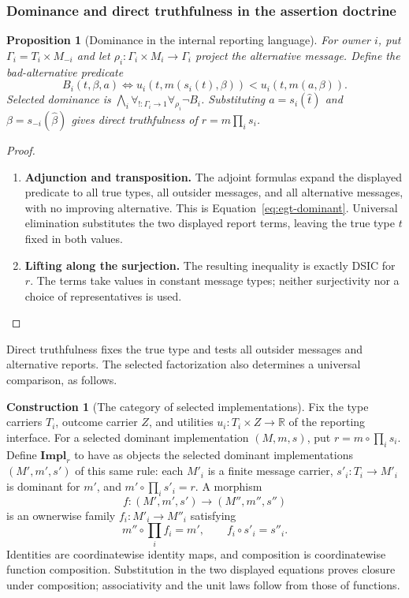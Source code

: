\documentclass[11pt,a4paper]{article}
\numberwithin{equation}{section}
\newtheorem{proposition}[theorem]{Proposition}
\theoremstyle{definition}
\newtheorem{construction}[construction]{Construction}
\theoremstyle{remark}
\theoremstyle{plain}
\begin{document}
\subsubsection{Dominance and direct truthfulness in the assertion doctrine}

\begin{proposition}[Dominance in the internal reporting language]
\label{prop:fib-dominance}
For owner $i$, put $\Gamma_i=T_i\times M_{-i}$ and let
$\rho_i:\Gamma_i\times M_i\to\Gamma_i$ project the alternative message.
Define the bad-alternative predicate
\[
 B_i(t,\beta,a)\iff
 u_i(t,m(s_i(t),\beta))<u_i(t,m(a,\beta)).
\]
Selected dominance is
$\bigwedge_i\forall_{!:\Gamma_i\to1}\forall_{\rho_i}\neg B_i$.
Substituting $a=s_i(\widehat t)$ and
$\beta=s_{-i}(\widehat\beta)$ gives direct truthfulness of
$r=m\prod_i s_i$.
\end{proposition}
\begin{proof}
\leavevmode
\begin{enumerate}[label=\textup{(\arabic*)},leftmargin=*,itemsep=4pt,topsep=3pt]
  \item \textbf{Adjunction and transposition.} The adjoint formulas expand the displayed predicate to all true types,
all outsider messages, and all alternative messages, with no improving
alternative. This is Equation~\eqref{eq:egt-dominant}. Universal
elimination substitutes the two displayed report terms, leaving the
true type $t$ fixed in both values.
  \item \textbf{Lifting along the surjection.} The resulting inequality is exactly
DSIC for $r$. The terms take values in constant message types; neither
surjectivity nor a choice of representatives is used.
\end{enumerate}
\end{proof}

Direct truthfulness fixes the true type and tests all outsider messages
and alternative reports. The selected factorization also determines a
universal comparison, as follows.

\begin{construction}[The category of selected implementations]
\label{con:egt-selected-implementation-category}
Fix the type carriers $T_i$, outcome carrier $Z$, and utilities
$u_i:T_i\times Z\to\mathbb R$ of the reporting interface. For a selected
dominant implementation $(M,m,s)$, put $r=m\circ\prod_i s_i$.
Define $\mathbf{Impl}_r$ to have as objects the selected dominant
implementations $(M',m',s')$ of this same rule: each $M'_i$ is a finite
message carrier, $s'_i:T_i\to M'_i$ is dominant for $m'$, and
$m'\circ\prod_i s'_i=r$. A morphism
\[
 f:(M',m',s')\longrightarrow(M'',m'',s'')
\]
is an ownerwise family $f_i:M'_i\to M''_i$ satisfying
\[
 m''\circ\prod_i f_i=m',\qquad f_i\circ s'_i=s''_i.
\]
Identities are coordinatewise identity maps, and composition is
coordinatewise function composition. Substitution in the two displayed
equations proves closure under composition; associativity and the unit
laws follow from those of functions.
\end{construction}
\end{document}
